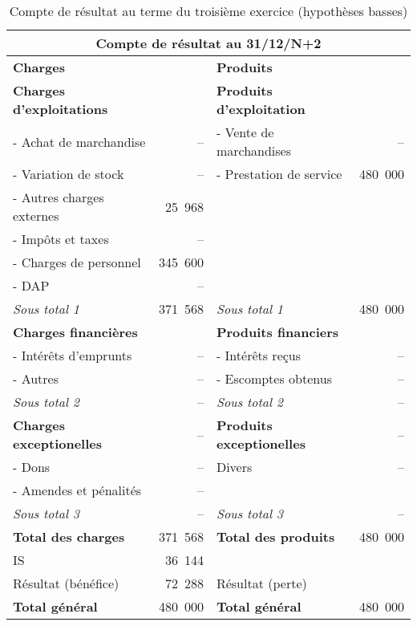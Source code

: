 		\vfill
		\begin{table}[h]
		  \centering
		  \begin{tabular}{|l|r|l|r|}
			\hline
			\multicolumn{4}{|c|}{\bf Compte de r\'esultat au 31/12/N+2}\\
			\hline
			{\bf Charges} & & {\bf Produits} & \\
			\hline
			{\bf Charges d'exploitations} & & {\bf Produits d'exploitation} & \\
			- Achat de marchandise & -- & - Vente de marchandises & --\\
			- Variation de stock & -- & - Prestation de service & 480~000\\
			- Autres charges externes & 25~968 & & \\
			- Impôts et taxes & -- & & \\
			- Charges de personnel & 345~600 & & \\
			- DAP & -- & & \\
			\cline{2-2}\cline{4-4}
			{\it Sous total 1} & 371~568 & {\it Sous total 1} & 480~000\\
			\cline{2-2}\cline{4-4}
			{\bf Charges financi\`eres} & & {\bf Produits financiers} & \\
			- Int\'er\^ets d'emprunts & -- & - Int\'er\^ets re\c cus & --\\
			- Autres & -- & - Escomptes obtenus & -- \\
			\cline{2-2}\cline{4-4}
			{\it Sous total 2} & -- & {\it Sous total 2} & -- \\
			\cline{2-2}\cline{4-4}
			{\bf Charges exceptionelles} & -- & {\bf Produits exceptionelles} & --\\
			- Dons & -- & Divers & --\\
			- Amendes et p\'enalit\'es & -- & & \\
			\cline{2-2}\cline{4-4}
			{\it Sous total 3} & -- & {\it Sous total 3} & -- \\
			\cline{2-2}\cline{4-4}
			{\bf Total des charges} & 371~568 & {\bf Total des produits} & 480~000 \\
			\cline{2-2}\cline{4-4}
			IS & 36~144 & & \\
			R\'esultat (b\'en\'efice) & 72~288 & R\'esultat (perte) & \\
			\cline{2-2}\cline{4-4}
			{\bf Total g\'en\'eral} & 480~000 & {\bf Total g\'en\'eral} & 480~000\\
			\hline
		  \end{tabular}
		  \caption{Compte de r\'esultat au terme du troisi\`eme exercice (hypoth\`eses basses)}
		  \label{tab:hypBN2}
		\end{table}

